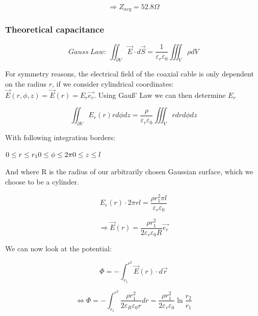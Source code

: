 \documentclass{scrartcl}
\begin{document}
\begin{equation}
    \boxed{\Rightarrow Z_{avg} = 52.8 \Omega}
\end{equation}

\subsubsection{Theoretical capacitance}

    \begin{equation}
        Gauss\ Law : \ \iint_{\partial V}\vec{E}\cdot d\vec{S} = \frac{1}{\varepsilon_r \varepsilon_0}\iiint_V \rho dV
    \end{equation}

    For symmetry reasons, the electrical field of the coaxial cable is only dependent on the radius $r$, if we consider cylindrical coordinates: $\vec{E}(r,\phi,z) = \vec{E}(r) = E_r\vec{e_r}$. Using Gauß' Law we can then determine $E_r$
    
    \begin{equation}
        \iint_{\partial V}E_r(r)rd\phi dz = \frac{\rho}{\varepsilon_r\varepsilon_0}\iiint_V rdrd\phi dz
    \end{equation}
    
    With following integration borders:
    
    \centering
    $
        0 \leq r \leq r_1 \\
        0 \leq \phi \leq 2 \pi \\
        0 \leq z \leq l 
    $

    \flushleft
    And where R is the radius of our arbitrarily chosen Gaussian surface, which we choose to be a cylinder.
    

    \begin{equation}
        E_r(r) \cdot 2\pi rl = \frac{\rho r_1^2 \pi l}{\varepsilon_r\varepsilon_0} 
    \end{equation}
    
    \begin{equation}
        \boxed{\Rightarrow \vec{E}(r) = \frac{\rho r_1^2}{2\varepsilon_r \varepsilon_0 R}\vec{e_r}}   
    \end{equation}
    
    We can now look at the potential:
    
    \begin{equation}
        \Phi = - \int_{r_1}^{r^2}\vec{E}(r)\cdot d\vec{r} 
    \end{equation}
        
    \begin{equation}
        \boxed{\Leftrightarrow \Phi = - \int_{r_1}^{r^2}\frac{\rho r_1^2}{2\varepsilon_R \varepsilon_0 r}dr = \frac{\rho r_1^2}{2\varepsilon_r \varepsilon_0} \ln {\frac{r_2}{r_1}}}  
    \end{equation}
    
\end{document}
